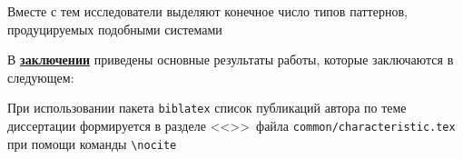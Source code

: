 Вместе с тем исследователи выделяют конечное число типов паттернов, продуцируемых подобными системами

\FloatBarrier
{}                                  %
В \underline{\textbf{заключении}} приведены основные результаты работы, которые заключаются в следующем:


При использовании пакета \verb!biblatex! список публикаций автора по теме
диссертации формируется в разделе <<\publications>>\ файла
\verb!common/characteristic.tex!  при помощи команды \verb!\nocite!

